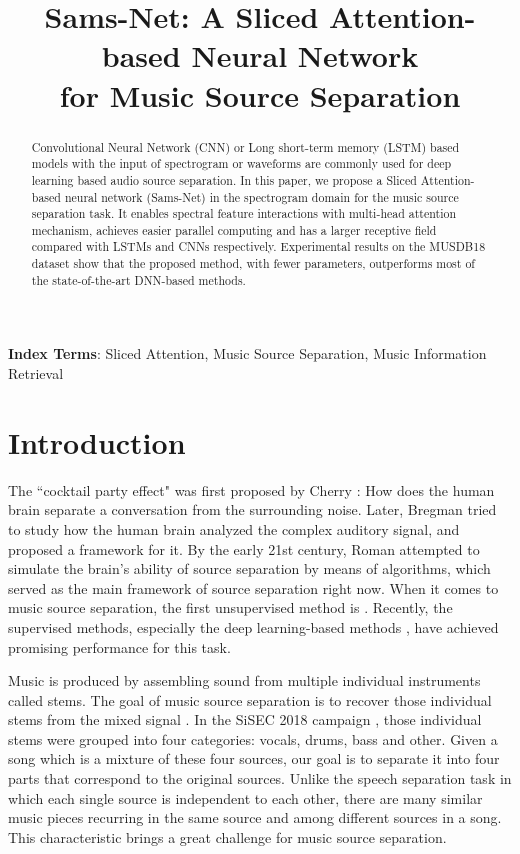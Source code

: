 \documentclass[a4paper]{article}
\title{Sams-Net: A Sliced Attention-based Neural Network \\ for Music Source Separation}
\begin{document}
\maketitle
\begin{abstract}
Convolutional Neural Network (CNN) or Long short-term memory (LSTM) based models with the input of spectrogram or waveforms are commonly used for deep learning based audio source separation. In this paper, we propose a Sliced Attention-based neural network (Sams-Net) in the spectrogram domain for the music source separation task. It enables spectral feature interactions with multi-head attention mechanism, achieves easier parallel computing and has a larger receptive field compared with LSTMs and CNNs respectively. Experimental results on the MUSDB18 dataset show that the proposed method, with fewer parameters, outperforms most of the state-of-the-art DNN-based methods.
\end{abstract}
\noindent\textbf{Index Terms}: Sliced Attention, Music Source Separation, Music Information Retrieval

\section{Introduction}

The ``cocktail party effect" was first proposed by Cherry \cite{cherry1953some}: How does the human brain separate a conversation from the surrounding noise. Later, Bregman \cite{bregman1994auditory} tried to study how the human brain analyzed the complex auditory signal, and proposed a framework for it. By the early 21st century, Roman \cite{roman2006pitch} attempted to simulate the brain's ability of source separation by means of algorithms, which served as the main framework of source separation right now. When it comes to music source separation, the first unsupervised method is \cite{li2007separation}. Recently, the supervised methods, especially the deep learning-based methods \cite{huang2014singing, jansson2017singing}, have achieved promising performance for this task.

Music is produced by assembling sound from multiple individual instruments called stems. The goal of music source separation is to recover those individual stems from the mixed signal \cite{vincent2005musical}. In the SiSEC 2018 campaign \cite{stoter20182018}, those individual stems were grouped into four categories: vocals, drums, bass and other. Given a song which is a mixture of these four sources, our goal is to separate it into four parts that correspond to the original sources. Unlike the speech separation task in which each single source is independent to each other, there are many similar music pieces recurring in the same source and among different sources in a song. This characteristic brings a great challenge for music source separation.
\end{document}
